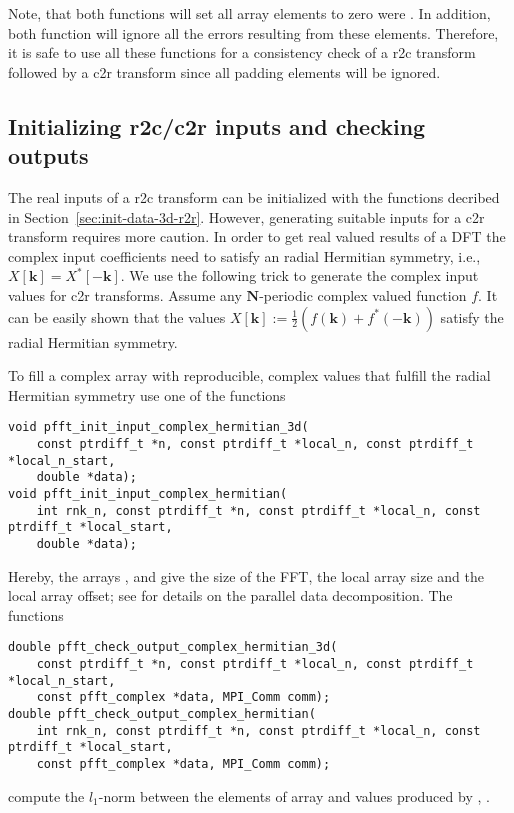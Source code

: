 Note, that both  functions will set all array elements to zero were .
In addition, both  function will ignore all the errors resulting from these elements.
Therefore, it is safe to use all these functions for a consistency check of a r2c transform followed by a c2r transform since all padding elements will be ignored.


\subsection{Initializing r2c/c2r inputs and checking outputs}\label{sec:init-data-3d-r2c}
The real inputs of a r2c transform can be initialized with the functions decribed in Section~\ref{sec:init-data-3d-r2r}.
However, generating suitable inputs for a c2r transform requires more caution.
In order to get real valued results of a DFT the complex input coefficients need to satisfy an radial Hermitian symmetry, i.e., $X[\mathbf k] = {X^*[-\mathbf k]}$.
We use the following trick to generate the complex input values for c2r transforms.
Assume any $\mathbf N$-periodic complex valued function $f$. It can be easily shown that the values
$X[\mathbf k] := \frac{1}{2}\left(f(\mathbf k)+f^*(-\mathbf k)\right)$ satisfy the radial Hermitian symmetry. 

To fill a complex array  with reproducible, complex values that fulfill the radial Hermitian symmetry use one of the functions
\begin{lstlisting}
void pfft_init_input_complex_hermitian_3d(
    const ptrdiff_t *n, const ptrdiff_t *local_n, const ptrdiff_t *local_n_start,
    double *data);
void pfft_init_input_complex_hermitian(
    int rnk_n, const ptrdiff_t *n, const ptrdiff_t *local_n, const ptrdiff_t *local_start,
    double *data);
\end{lstlisting}
Hereby, the arrays ,  and  give the size of the FFT, the local array size and the local array offset;
see \cite{sec:par-data-decomp} for details on the parallel data decomposition.
The functions
\begin{lstlisting}
double pfft_check_output_complex_hermitian_3d(
    const ptrdiff_t *n, const ptrdiff_t *local_n, const ptrdiff_t *local_n_start,
    const pfft_complex *data, MPI_Comm comm);
double pfft_check_output_complex_hermitian(
    int rnk_n, const ptrdiff_t *n, const ptrdiff_t *local_n, const ptrdiff_t *local_start,
    const pfft_complex *data, MPI_Comm comm);
\end{lstlisting}
compute the $l_1$-norm between the elements of array  and values produced by , .

